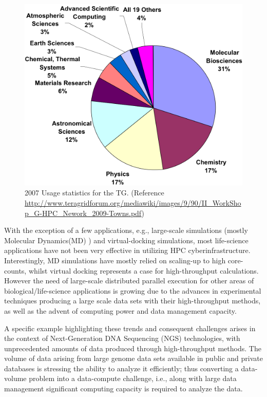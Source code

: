 \documentclass[]{article}
\begin{document}
\begin{figure}
 \centering
\includegraphics[scale=0.40]{figures/teragrid-discipline07}
\caption{\small 2007 Usage statistics for the TG.  (Reference
  \url{http://www.teragridforum.org/mediawiki/images/9/90/II_WorkShop_G-HPC_Nework_2009-Towns.pdf})}
  \label{tg2007}
\end{figure}

With the exception of a few applications, e.g., large-scale
simulations (mostly Molecular Dynamics(MD) ) and virtual-docking
simulations, most life-science applications have not been very
effective in utilizing HPC cyberinfrastructure.  Interestingly, MD
simulations have mostly relied on scaling-up to high core-counts,
whilst virtual docking represents a case for high-throughput calculations.  However
the need of large-scale distributed parallel execution for other
areas of biological/life-science applications is growing due to the
advances in experimental techniques producing a large scale data sets with their high-throughput methods, as well as the advent of computing power and data management capacity.  

A specific example highlighting these trends and consequent challenges
arises in the context of Next-Generation DNA Sequencing (NGS)
technologies, with unprecedented amounts of data produced through
high-throughput methods.  The volume of data arising from large genome
data sets available in public and private databases is stressing the
ability to analyze it efficiently; thus converting a data-volume
problem into a data-compute challenge, i.e., along with large data
management significant computing capacity is required to analyze the
data.
\end{document}
